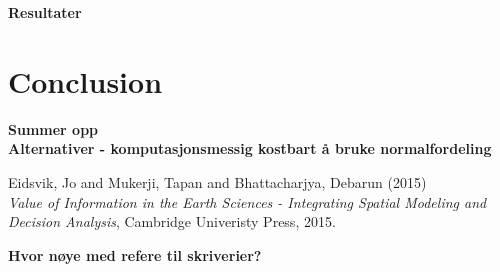 \documentclass{article}
\begin{document}
\textbf{Resultater} \\
\section{Conclusion}
\textbf{Summer opp} \\
\textbf{Alternativer - komputasjonsmessig kostbart å bruke normalfordeling} \\

\begin{thebibliography}{9}

 Eidsvik, Jo and Mukerji, Tapan and Bhattacharjya, Debarun (2015) \\ \emph{Value of Information in the Earth Sciences - Integrating Spatial Modeling and Decision Analysis}, Cambridge Univeristy Press, 2015. 


\end{thebibliography}
\textbf{Hvor nøye med refere til skriverier?}
\end{document}
